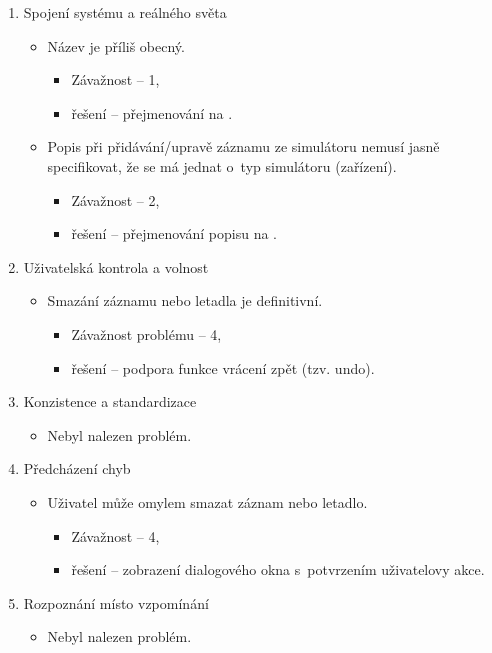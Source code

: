 \documentclass[thesis=M,czech]{FITthesis}[2012/06/26]
\begin{document}
\begin{enumerate}
\item Spojení systému a reálného světa
\begin{itemize}
 	\item Název  je příliš obecný.
 	\begin{itemize}
 		\item Závažnost -- 1,
 		\item řešení -- přejmenování  na .
 	\end{itemize}
 	\item Popis  při přidávání/upravě záznamu ze simulátoru nemusí jasně specifikovat, že se má jednat o~typ simulátoru (zařízení).
 	\begin{itemize}
 		\item Závažnost -- 2,
 		\item řešení -- přejmenování popisu  na .
 	\end{itemize}
\end{itemize}
 
\item Uživatelská kontrola a volnost
\begin{itemize}
	\item Smazání záznamu nebo letadla je definitivní.
	\begin{itemize}
		\item Závažnost problému -- 4,
		\item řešení -- podpora funkce vrácení zpět (tzv. undo).
	\end{itemize}
\end{itemize}
 
\item Konzistence a standardizace 
\begin{itemize}
 	\item Nebyl nalezen problém.
\end{itemize}
 
\item Předcházení chyb 
\begin{itemize}
 	\item Uživatel může omylem smazat záznam nebo letadlo.
 	\begin{itemize}
 		\item Závažnost -- 4,
 		\item řešení -- zobrazení dialogového okna s~potvrzením uživatelovy akce.
 	\end{itemize}
\end{itemize}
 
\item Rozpoznání místo vzpomínání
\begin{itemize}
 	\item Nebyl nalezen problém.
\end{itemize}
 

\end{enumerate}
\end{document}
